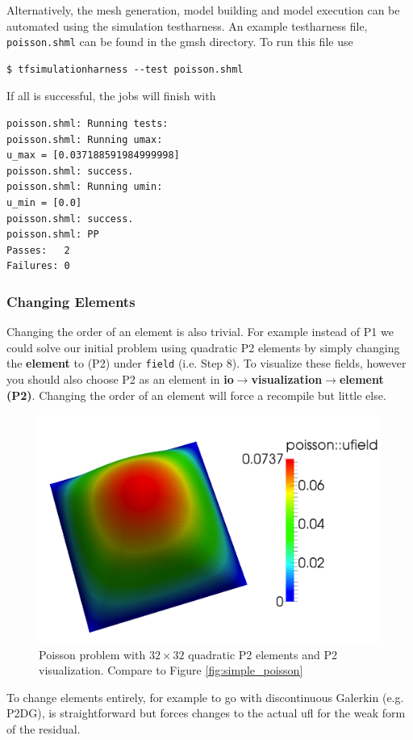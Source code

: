 Alternatively, the mesh generation, model building and model execution
can be automated using the simulation testharness.  An example
testharness file, \texttt{poisson.shml} can be found in the gmsh
directory.  To run this file use
\begin{lstlisting}[style=Bash]
$ tfsimulationharness --test poisson.shml
\end{lstlisting}
If all is successful,  the jobs will finish with
\begin{lstlisting}[style=Bash]
poisson.shml: Running tests:
poisson.shml: Running umax:
u_max = [0.037188591984999998]
poisson.shml: success.
poisson.shml: Running umin:
u_min = [0.0]
poisson.shml: success.
poisson.shml: PP
Passes:   2
Failures: 0
\end{lstlisting}


\subsubsection{Changing Elements}
\label{sec:changing-meshes}

Changing the order of an element is also trivial. For example
instead of P1 we could solve our initial problem using quadratic P2
elements by simply changing the \textbf{element} to (P2) under
\texttt{field} (i.e. Step 8).  To visualize these fields, however you
should also choose P2 as an element in
\textbf{io}$\rightarrow$\textbf{visualization}$\rightarrow$\textbf{element
(P2)}.  Changing the order of an element will force a recompile but
little else.
\begin{figure}[ht!]
  \centering
  \includegraphics[width=.7\textwidth]{figures/poisson_simple_p2}
  \caption{Poisson problem with $32\times 32$ quadratic P2 elements and P2
    visualization. Compare to Figure \ref{fig:simple_poisson}}
  \label{fig:poisson-P2}
\end{figure}

To change elements entirely, for example to go with discontinuous
Galerkin (e.g. P2DG), is straightforward but forces changes to the
actual ufl for the weak form of the residual.

